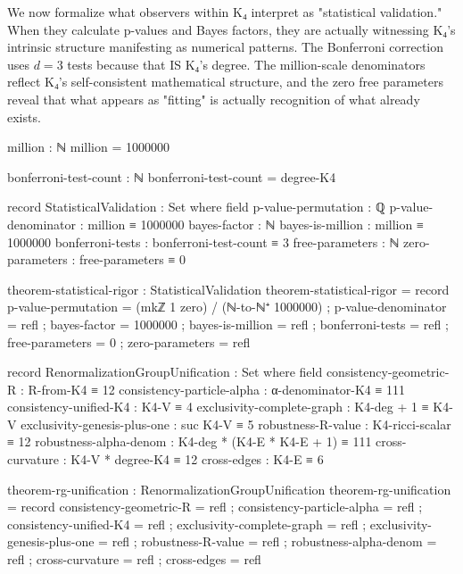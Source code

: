 \documentclass[11pt,a4paper]{book}
\begin{document}
We now formalize what observers within K₄ interpret as "statistical validation." When they calculate p-values and Bayes factors, they are actually witnessing K₄'s intrinsic structure manifesting as numerical patterns. The Bonferroni correction uses $d = 3$ tests because that IS K₄'s degree. The million-scale denominators reflect K₄'s self-consistent mathematical structure, and the zero free parameters reveal that what appears as "fitting" is actually recognition of what already exists.

\begin{code}
million : ℕ
million = 1000000

bonferroni-test-count : ℕ
bonferroni-test-count = degree-K4

record StatisticalValidation : Set where
  field
    p-value-permutation : ℚ
    p-value-denominator : million ≡ 1000000
    bayes-factor : ℕ
    bayes-is-million : million ≡ 1000000
    bonferroni-tests : bonferroni-test-count ≡ 3
    free-parameters : ℕ
    zero-parameters : free-parameters ≡ 0

theorem-statistical-rigor : StatisticalValidation
theorem-statistical-rigor = record
  { p-value-permutation = (mkℤ 1 zero) / (ℕ-to-ℕ⁺ 1000000)
  ; p-value-denominator = refl
  ; bayes-factor = 1000000
  ; bayes-is-million = refl
  ; bonferroni-tests = refl
  ; free-parameters = 0
  ; zero-parameters = refl
  }
\end{code}

\begin{code}
record RenormalizationGroupUnification : Set where
  field
    consistency-geometric-R : R-from-K4 ≡ 12
    consistency-particle-alpha : α-denominator-K4 ≡ 111
    consistency-unified-K4 : K4-V ≡ 4
    exclusivity-complete-graph : K4-deg + 1 ≡ K4-V
    exclusivity-genesis-plus-one : suc K4-V ≡ 5
    robustness-R-value : K4-ricci-scalar ≡ 12
    robustness-alpha-denom : K4-deg * (K4-E * K4-E + 1) ≡ 111
    cross-curvature : K4-V * degree-K4 ≡ 12
    cross-edges : K4-E ≡ 6

theorem-rg-unification : RenormalizationGroupUnification
theorem-rg-unification = record
  { consistency-geometric-R = refl
  ; consistency-particle-alpha = refl
  ; consistency-unified-K4 = refl
  ; exclusivity-complete-graph = refl
  ; exclusivity-genesis-plus-one = refl
  ; robustness-R-value = refl
  ; robustness-alpha-denom = refl
  ; cross-curvature = refl
  ; cross-edges = refl
  }
\end{code}
\end{document}
